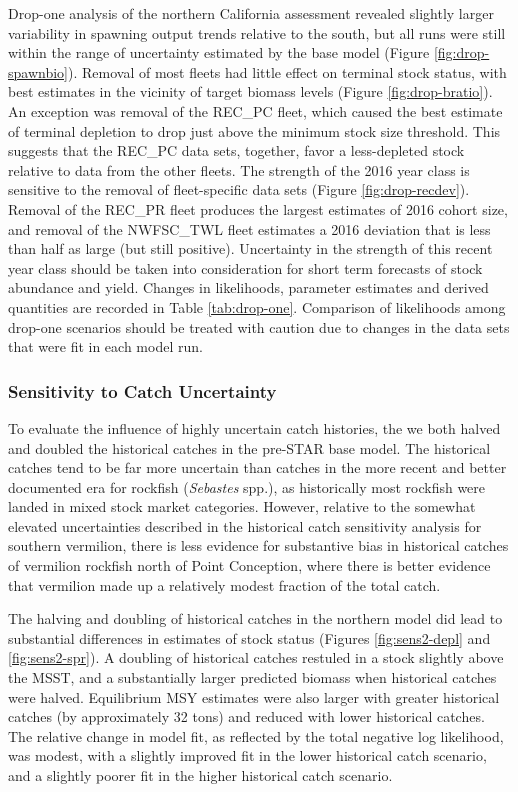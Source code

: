 \documentclass[
  english,
  a4paper,
]{article}
\begin{document}
Drop-one analysis of the northern California assessment revealed slightly larger variability in spawning output trends relative to the south, but all runs were still within the range of uncertainty estimated by the base model (Figure \ref{fig:drop-spawnbio}). Removal of most fleets had little effect on terminal stock status, with best estimates in the vicinity of target biomass levels (Figure \ref{fig:drop-bratio}). An exception was removal of the REC\_PC fleet, which caused the best estimate of terminal depletion to drop just above the minimum stock size threshold. This suggests that the REC\_PC data sets, together, favor a less-depleted stock relative to data from the other fleets. The strength of the 2016 year class is sensitive to the removal of fleet-specific data sets (Figure \ref{fig:drop-recdev}). Removal of the REC\_PR fleet produces the largest estimates of 2016 cohort size, and removal of the NWFSC\_TWL fleet estimates a 2016 deviation that is less than half as large (but still positive). Uncertainty in the strength of this recent year class should be taken into consideration for short term forecasts of stock abundance and yield. Changes in likelihoods, parameter estimates and derived quantities are recorded in Table \ref{tab:drop-one}. Comparison of likelihoods among drop-one scenarios should be treated with caution due to changes in the data sets that were fit in each model run.

\hypertarget{sensitivity-to-catch-uncertainty}{%
\subsubsection{Sensitivity to Catch Uncertainty}\label{sensitivity-to-catch-uncertainty}}

To evaluate the influence of highly uncertain catch histories, the we both halved and doubled the historical catches in the pre-STAR base model. The historical catches tend to be far more uncertain than catches in the more recent and better documented era for rockfish (\emph{Sebastes} spp.), as historically most rockfish were landed in mixed stock market categories. However, relative to the somewhat elevated uncertainties described in the historical catch sensitivity analysis for southern vermilion, there is less evidence for substantive bias in historical catches of vermilion rockfish north of Point Conception, where there is better evidence that vermilion made up a relatively modest fraction of the total catch.

The halving and doubling of historical catches in the northern model did lead to substantial differences in estimates of stock status (Figures \ref{fig:sens2-depl} and \ref{fig:sens2-spr}). A doubling of historical catches restuled in a stock slightly above the MSST, and a substantially larger predicted biomass when historical catches were halved. Equilibrium MSY estimates were also larger with greater historical catches (by approximately 32 tons) and reduced with lower historical catches. The relative change in model fit, as reflected by the total negative log likelihood, was modest, with a slightly improved fit in the lower historical catch scenario, and a slightly poorer fit in the higher historical catch scenario.
\end{document}
